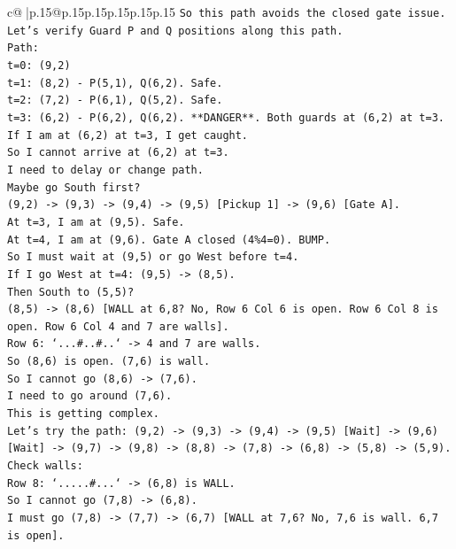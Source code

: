 \documentclass{article}
\begin{document}
{\begin{supertabular}{c@{$\;$}|p{.15\linewidth}@{}p{.15\linewidth}p{.15\linewidth}p{.15\linewidth}p{.15\linewidth}p{.15\linewidth}}
{{{\texttt{So this path avoids the closed gate issue.} \\
\texttt{Let's verify Guard P and Q positions along this path.} \\
\texttt{Path:} \\
\texttt{t=0: (9,2)} \\
\texttt{t=1: (8,2) {-} P(5,1), Q(6,2). Safe.} \\
\texttt{t=2: (7,2) {-} P(6,1), Q(5,2). Safe.} \\
\texttt{t=3: (6,2) {-} P(6,2), Q(6,2). **DANGER**. Both guards at (6,2) at t=3.} \\
\texttt{If I am at (6,2) at t=3, I get caught.} \\
\texttt{So I cannot arrive at (6,2) at t=3.} \\
\texttt{I need to delay or change path.} \\
\texttt{Maybe go South first?} \\
\texttt{(9,2) {-}> (9,3) {-}> (9,4) {-}> (9,5) {[}Pickup 1{]} {-}> (9,6) {[}Gate A{]}.} \\
\texttt{At t=3, I am at (9,5). Safe.} \\
\texttt{At t=4, I am at (9,6). Gate A closed (4\%4=0). BUMP.} \\
\texttt{So I must wait at (9,5) or go West before t=4.} \\
\texttt{If I go West at t=4: (9,5) {-}> (8,5).} \\
\texttt{Then South to (5,5)?} \\
\texttt{(8,5) {-}> (8,6) {[}WALL at 6,8? No, Row 6 Col 6 is open. Row 6 Col 8 is open. Row 6 Col 4 and 7 are walls{]}.} \\
\texttt{Row 6: `...\#..\#..` {-}> 4 and 7 are walls.} \\
\texttt{So (8,6) is open. (7,6) is wall.} \\
\texttt{So I cannot go (8,6) {-}> (7,6).} \\
\texttt{I need to go around (7,6).} \\
\texttt{This is getting complex.} \\
\texttt{Let's try the path: (9,2) {-}> (9,3) {-}> (9,4) {-}> (9,5) {[}Wait{]} {-}> (9,6) {[}Wait{]} {-}> (9,7) {-}> (9,8) {-}> (8,8) {-}> (7,8) {-}> (6,8) {-}> (5,8) {-}> (5,9).} \\
\texttt{Check walls:} \\
\texttt{Row 8: `.....\#...` {-}> (6,8) is WALL.} \\
\texttt{So I cannot go (7,8) {-}> (6,8).} \\
\texttt{I must go (7,8) {-}> (7,7) {-}> (6,7) {[}WALL at 7,6? No, 7,6 is wall. 6,7 is open{]}.} \\
}}}
\end{supertabular}}
\end{document}
